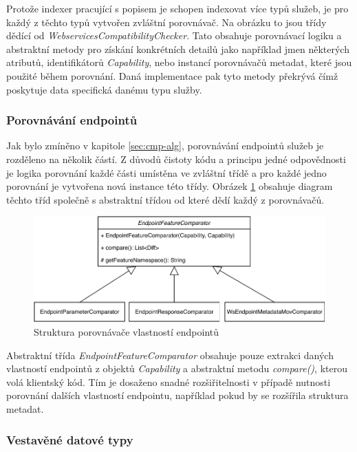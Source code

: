 \documentclass[czech,DP]{thesiskiv}
\begin{document}
Protože indexer pracující s popisem je schopen indexovat více typů služeb, je pro každý z těchto typů vytvořen zvláštní porovnávač. Na obrázku to jsou třídy dědící od \textit{WebservicesCompatibilityChecker}. Tato obsahuje porovnávací logiku a abstraktní metody pro získání konkrétních detailů jako například jmen některých atributů, identifikátorů \textit{Capability}, nebo instancí porovnávačů metadat, které jsou použité během porovnání. Daná implementace pak tyto metody překrývá čímž poskytuje data specifická danému typu služby.

\subsubsection{Porovnávání endpointů}

Jak bylo zmíněno v kapitole \ref{sec:cmp-alg}, porovnávání endpointů služeb je rozděleno na několik částí. Z důvodů čistoty kódu a principu jedné odpovědnosti je logika porovnání každé části umístěna ve zvláštní třídě a pro každé jedno porovnání je vytvořena nová instance této třídy. Obrázek \ref{fig:endpoint-cmp-uml-class} obsahuje diagram těchto tříd společně s abstraktní třídou od které dědí každý z porovnávačů. 

\begin{figure}[h]
	\centering
	\includegraphics[width=\linewidth]{endpoint-cmp-uml-class}
	\caption{Struktura porovnávače vlastností endpointů}
	\label{fig:endpoint-cmp-uml-class}
\end{figure}

Abstraktní třída \textit{EndpointFeatureComparator} obsahuje pouze extrakci daných vlastností endpointů z objektů \textit{Capability} a abstraktní metodu \textit{compare()}, kterou volá klientský kód. Tím je dosaženo snadné rozšiřitelnosti v případě nutnosti porovnání dalších vlastností endpointu, například pokud by se rozšířila struktura metadat. 

\subsubsection{Vestavěné datové typy}
\end{document}
